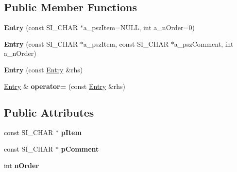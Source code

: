 \subsection*{Public Member Functions}
\begin{DoxyCompactItemize}
\item 
{\bfseries Entry} (const S\+I\+\_\+\+C\+H\+AR $\ast$a\+\_\+psz\+Item=N\+U\+LL, int a\+\_\+n\+Order=0)\hypertarget{struct_c_simple_ini_templ_1_1_entry_a20fc446e1f56f562333042a19bb57c9c}{}\label{struct_c_simple_ini_templ_1_1_entry_a20fc446e1f56f562333042a19bb57c9c}

\item 
{\bfseries Entry} (const S\+I\+\_\+\+C\+H\+AR $\ast$a\+\_\+psz\+Item, const S\+I\+\_\+\+C\+H\+AR $\ast$a\+\_\+psz\+Comment, int a\+\_\+n\+Order)\hypertarget{struct_c_simple_ini_templ_1_1_entry_aaa6fc487377a2fc91dc4f0b83e572996}{}\label{struct_c_simple_ini_templ_1_1_entry_aaa6fc487377a2fc91dc4f0b83e572996}

\item 
{\bfseries Entry} (const \hyperlink{struct_c_simple_ini_templ_1_1_entry}{Entry} \&rhs)\hypertarget{struct_c_simple_ini_templ_1_1_entry_afbe8b9d3c87d5de3c6aa8d8984f011f6}{}\label{struct_c_simple_ini_templ_1_1_entry_afbe8b9d3c87d5de3c6aa8d8984f011f6}

\item 
\hyperlink{struct_c_simple_ini_templ_1_1_entry}{Entry} \& {\bfseries operator=} (const \hyperlink{struct_c_simple_ini_templ_1_1_entry}{Entry} \&rhs)\hypertarget{struct_c_simple_ini_templ_1_1_entry_a7f4dd11cc944c140d751ae22ef6cd034}{}\label{struct_c_simple_ini_templ_1_1_entry_a7f4dd11cc944c140d751ae22ef6cd034}

\end{DoxyCompactItemize}
\subsection*{Public Attributes}
\begin{DoxyCompactItemize}
\item 
const S\+I\+\_\+\+C\+H\+AR $\ast$ {\bfseries p\+Item}\hypertarget{struct_c_simple_ini_templ_1_1_entry_a0f987914bf6076156c2a7c40e8e09c89}{}\label{struct_c_simple_ini_templ_1_1_entry_a0f987914bf6076156c2a7c40e8e09c89}

\item 
const S\+I\+\_\+\+C\+H\+AR $\ast$ {\bfseries p\+Comment}\hypertarget{struct_c_simple_ini_templ_1_1_entry_a84364bcded2d32c5ae4241bf197a74c4}{}\label{struct_c_simple_ini_templ_1_1_entry_a84364bcded2d32c5ae4241bf197a74c4}

\item 
int {\bfseries n\+Order}\hypertarget{struct_c_simple_ini_templ_1_1_entry_ac08ed1fec5743b35aebfa8635e1bdb5a}{}\label{struct_c_simple_ini_templ_1_1_entry_ac08ed1fec5743b35aebfa8635e1bdb5a}

\end{DoxyCompactItemize}


